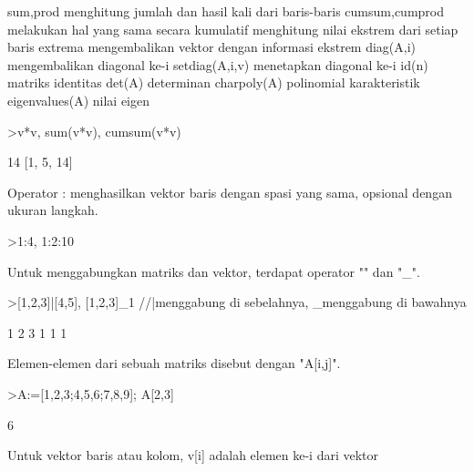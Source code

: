\documentclass[a4paper,10pt]{article}
\begin{document}
\begin{eulernotebook}
\begin{eulercomment}
\end{eulercomment}
\begin{eulerttcomment}
  sum,prod menghitung jumlah dan hasil kali dari baris-baris
  cumsum,cumprod melakukan hal yang sama secara kumulatif
  menghitung nilai ekstrem dari setiap baris
  extrema mengembalikan vektor dengan informasi ekstrem
  diag(A,i) mengembalikan diagonal ke-i
  setdiag(A,i,v) menetapkan diagonal ke-i
  id(n) matriks identitas
  det(A) determinan
  charpoly(A) polinomial karakteristik
  eigenvalues(A) nilai eigen
\end{eulerttcomment}
\begin{eulerprompt}
>v*v, sum(v*v), cumsum(v*v)
\end{eulerprompt}
\begin{euleroutput}
  [1,  4,  9]
  14
  [1,  5,  14]
\end{euleroutput}
\begin{eulercomment}
Operator : menghasilkan vektor baris dengan spasi yang sama, opsional
dengan ukuran langkah.
\end{eulercomment}
\begin{eulerprompt}
>1:4, 1:2:10
\end{eulerprompt}
\begin{euleroutput}
  [1,  2,  3,  4]
  [1,  3,  5,  7,  9]
\end{euleroutput}
\begin{eulercomment}
Untuk menggabungkan matriks dan vektor, terdapat operator "\textbar{}" dan "\_".
\end{eulercomment}
\begin{eulerprompt}
>[1,2,3]|[4,5], [1,2,3]_1 //|menggabung di sebelahnya, _menggabung di bawahnya
\end{eulerprompt}
\begin{euleroutput}
  [1,  2,  3,  4,  5]
              1             2             3 
              1             1             1 
\end{euleroutput}
\begin{eulercomment}
Elemen-elemen dari sebuah matriks disebut dengan "A[i,j]".
\end{eulercomment}
\begin{eulerprompt}
>A:=[1,2,3;4,5,6;7,8,9]; A[2,3]
\end{eulerprompt}
\begin{euleroutput}
  6
\end{euleroutput}
\begin{eulercomment}
Untuk vektor baris atau kolom, v[i] adalah elemen ke-i dari vektor

\end{eulercomment}
\end{eulernotebook}
\end{document}
